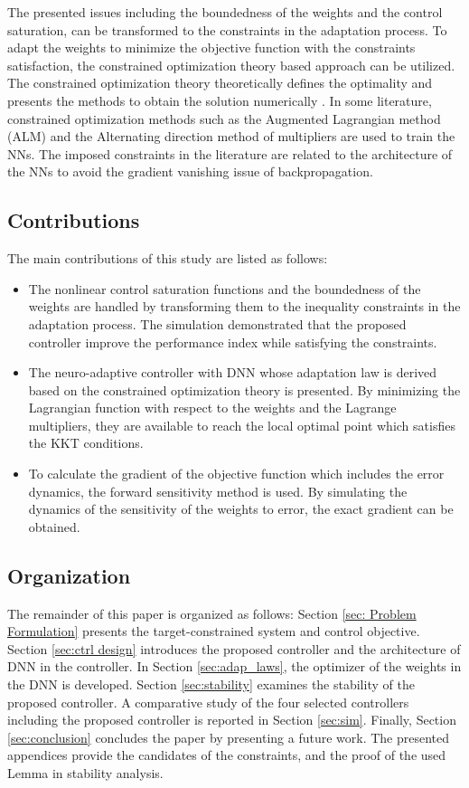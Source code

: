 \documentclass[lettersize,journal]{IEEEtran}
\begin{document}
The presented issues including the boundedness of the weights and the control saturation, can be transformed to the constraints in the adaptation process.
To adapt the weights to minimize the objective function with the constraints satisfaction, the constrained optimization theory based approach can be utilized.
The constrained optimization theory theoretically defines the optimality and presents the methods to obtain the solution numerically \cite{RN22}.
In some literature, constrained optimization methods such as the Augmented Lagrangian method (ALM) \cite{RN59} and the Alternating direction method of multipliers \cite{RN58, RN60} are used to train the NNs.
The imposed constraints in the literature are related to the architecture of the NNs to avoid the gradient vanishing issue of backpropagation.

\subsection{Contributions}

The main contributions of this study are listed as follows:
\begin{itemize}
    \item The nonlinear control saturation functions and the boundedness of the weights are handled by transforming them to the inequality constraints in the adaptation process.   
    The simulation demonstrated that the proposed controller improve the performance index while satisfying the constraints.
    \item The neuro-adaptive controller with DNN whose adaptation law is derived based on the constrained optimization theory is presented.
    By minimizing the Lagrangian function with respect to the weights and the Lagrange multipliers, they are available to reach the local optimal point which satisfies the KKT conditions.
    \item To calculate the gradient of the objective function which includes the error dynamics, the forward sensitivity method is used.
    By simulating the dynamics of the sensitivity of the weights to error, the exact gradient can be obtained.
\end{itemize}

\subsection{Organization}

The remainder of this paper is organized as follows:
Section \ref{sec: Problem Formulation} presents the target-constrained system and control objective.
Section \ref{sec:ctrl design} introduces the proposed controller and the architecture of DNN in the controller. 
In Section \ref{sec:adap_laws}, the optimizer of the weights in the DNN is developed.
Section \ref{sec:stability} examines the stability of the proposed controller.
A comparative study of the four selected controllers including the proposed controller is reported in Section \ref{sec:sim}.
Finally, Section \ref{sec:conclusion} concludes the paper by presenting a future work.
The presented appendices provide the candidates of the constraints, and the proof of the used Lemma in stability analysis.
\end{document}
